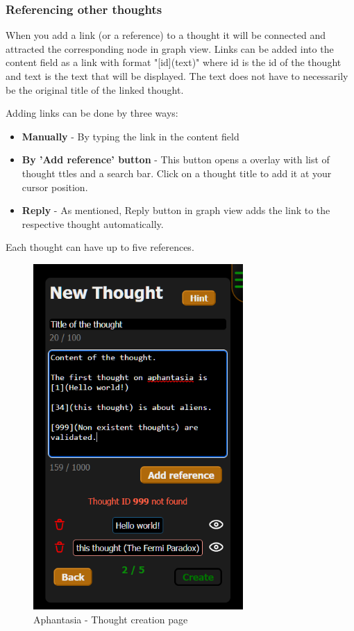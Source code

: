 \subsubsection*{Referencing other thoughts}
When you add a link (or a reference) to a thought it will be connected and attracted the corresponding node in graph view.
Links can be added into the content field as a link with format "[id](text)"
where id is the id of the thought and text is the text that will be displayed.
The text does not have to necessarily be the original title of the linked thought.

Adding links can be done by three ways:
\begin{itemize}
  \item \textbf{Manually} - By typing the link in the content field
  \item \textbf{By 'Add reference' button} - This button opens a overlay with list of thought ttles and a search bar.
  Click on a thought title to add it at your cursor position.
  \item \textbf{Reply} - As mentioned, Reply button in graph view adds the link to the respective thought automatically.
\end{itemize}

Each thought can have up to five references.

\begin{figure}[p]\centering
  \includegraphics[width=80mm, keepaspectratio]{img/afantazie_thought_creation_page.png}
  \caption{Aphantasia - Thought creation page}
  \label{obr:afantazie_thought_creation_page}
\end{figure}

